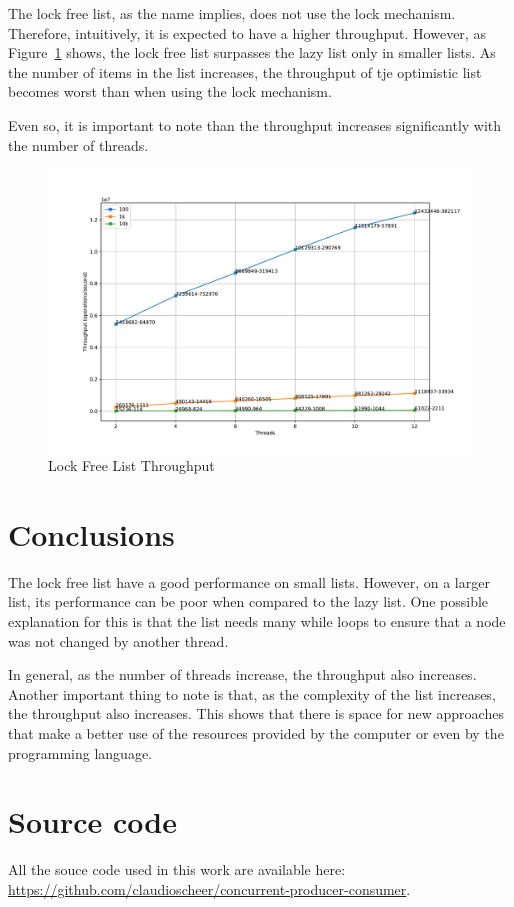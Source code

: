 \documentclass{article}
\begin{document}
The lock free list, as the name implies, does not use the lock mechanism. Therefore, intuitively, it is expected to have a higher throughput. However, as Figure~\ref{fig:lock-free-throughput} shows, the lock free list surpasses the lazy list only in smaller lists. As the number of items in the list increases, the throughput of tje optimistic list becomes worst than when using the lock mechanism.

Even so, it is important to note than the throughput increases significantly with the number of threads.

\begin{figure}[H]
    \centering
    \includegraphics[width=\textwidth]{../test/plots/LockFreeListThroughput.pdf}
    \caption{Lock Free List Throughput}
    \label{fig:lock-free-throughput}
\end{figure}


\section{Conclusions}

The lock free list have a good performance on small lists. However, on a larger list, its performance can be poor when compared to the lazy list. One possible explanation for this is that the list needs many while loops to ensure that a node was not changed by another thread.

In general, as the number of threads increase, the throughput also increases. Another important thing to note is that, as the complexity of the list increases, the throughput also increases. This shows that there is space for new approaches that make a better use of the resources provided by the computer or even by the programming language.


\section{Source code} \label{sec:source-code}

All the souce code used in this work are available here: \url{https://github.com/claudioscheer/concurrent-producer-consumer}.
\end{document}
